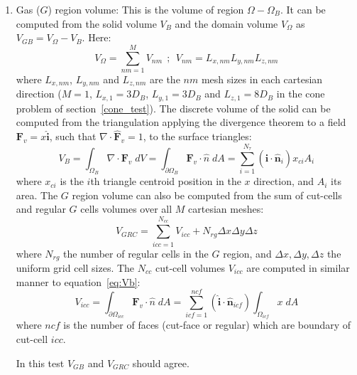 \documentclass[12pt]{article}
\begin{document}
\begin{enumerate}
    \item Gas ($G$) region volume: 
    This is the volume of region $\Omega-\Omega_B$. It can be computed from the solid volume $V_B$ and the domain volume $V_\Omega$ as $V_{GB}=V_\Omega-V_B$. Here:
    \begin{equation}
       V_\Omega=\sum_{nm=1}^M {V_{nm}} \: \: ; \: \: V_{nm}=L_{x,nm} L_{y,nm} L_{z,nm}
    \end{equation}
    where $L_{x,nm}$, $L_{y,nm}$ and $L_{z,nm}$ are the $nm$ mesh sizes in each cartesian direction ($M=1$, $L_{x,1}=3D_B$, $L_{y,1}=3D_B$ and $L_{z,1}=8D_B$ in the cone problem of section~\ref{cone_test}). The discrete volume of the solid can be computed from the triangulation applying the divergence theorem to a field $\mathbf{F}_v=x \mathbf{\hat{i}}$, such that $\nabla \cdot \mathbf{\hat{F}}_v=1$, to the surface triangles:
    \begin{equation}
      V_B = \int_{\Omega _{B}} \nabla \cdot \mathbf{F}_v \; dV = 
      \int_{\partial \Omega _{B}}  \mathbf{F}_v \cdot \hat{n} \; dA =
      \sum_{i=1}^{N_\tau}{(\mathbf{\hat{i}} \cdot \mathbf{\hat{n}}_i) x_{ci} A_i}
      \label{eq:Vb}
    \end{equation}
    where $x_{ci}$ is the $i$th triangle centroid position in the $x$ direction, and $A_i$ its area.
    The $G$ region volume can also be computed from the sum of cut-cells and regular $G$ cells volumes over all $M$ cartesian meshes:
    \begin{equation}
       V_{GRC} = \sum_{icc=1}^{N_{cc}}{V_{icc}} + N_{rg} \Delta x \Delta y \Delta z
       \label{}
    \end{equation}
    where $N_{rg}$ the number of regular cells in the $G$ region, and $\Delta x,\Delta y,\Delta z$ the uniform grid cell sizes. The  $N_{cc}$ cut-cell volumes $V_{icc}$ are computed in similar manner to equation~\eqref{eq:Vb}:
    \begin{equation}
    V_{icc} = \int_{\partial \Omega _{icc}}  \mathbf{F}_v \cdot \hat{n} \; dA = 
    \sum_{icf=1}^{ncf} (\mathbf{\hat{i}} \cdot \mathbf{\hat{n}}_{icf}) \int_{\Omega _{icf}} x \; dA
    \label{eq:vol2}
    \end{equation}
    where $ncf$ is the number of faces (cut-face or regular) which are boundary of cut-cell $icc$.
    
    In this test $V_{GB}$ and $V_{GRC}$ should agree.
    \newline 
    

\end{enumerate}
\end{document}
